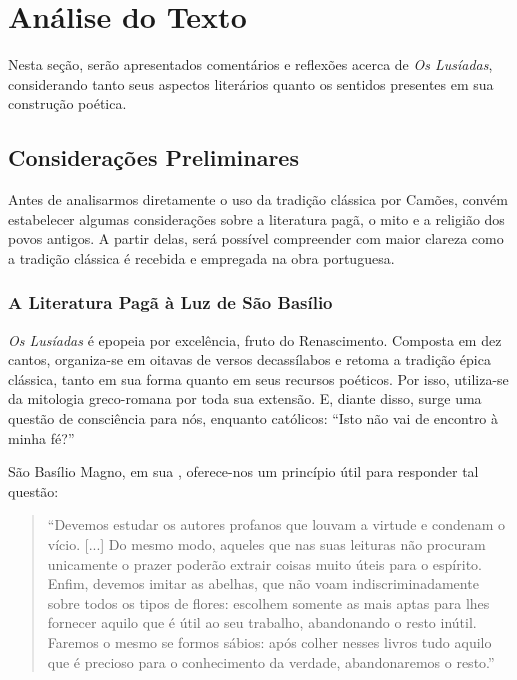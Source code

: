 \newpage
\section{Análise do Texto}

Nesta seção, serão apresentados comentários e reflexões acerca de \textit{Os
Lusíadas}, considerando tanto seus aspectos literários quanto os sentidos
presentes em sua construção poética.

\subsection{Considerações Preliminares}

Antes de analisarmos diretamente o uso da tradição clássica por Camões, convém
estabelecer algumas considerações sobre a literatura pagã, o mito e a religião
dos povos antigos. A partir delas, será possível compreender com maior clareza
como a tradição clássica é recebida e empregada na obra portuguesa.

\subsubsection{A Literatura Pagã à Luz de São Basílio}

\textit{Os Lusíadas} é epopeia por excelência, fruto do Renascimento. Composta
em dez cantos, organiza-se em oitavas de versos decassílabos e retoma a
tradição épica clássica, tanto em sua forma quanto em seus recursos poéticos.
Por isso, utiliza-se da mitologia greco-romana por toda sua extensão. E, diante
disso, surge uma questão de consciência para nós, enquanto católicos: ``Isto
não vai de encontro à minha fé?''

São Basílio Magno, em sua 
\cite{basilio_carta_jovens}, oferece-nos um princípio útil para responder tal
questão:

\begin{quote}
  ``Devemos estudar os autores profanos que louvam a virtude e condenam o
  vício. [...] Do mesmo modo, aqueles que nas suas leituras não procuram
  unicamente o prazer poderão extrair coisas muito úteis para o espírito.
  Enfim, devemos imitar as abelhas, que não voam indiscriminadamente sobre
  todos os tipos de flores: escolhem somente as mais aptas para lhes fornecer
  aquilo que é útil ao seu trabalho, abandonando o resto inútil. Faremos o
  mesmo se formos sábios: após colher nesses livros tudo aquilo que é precioso
  para o conhecimento da verdade, abandonaremos o resto.''
\end{quote}

